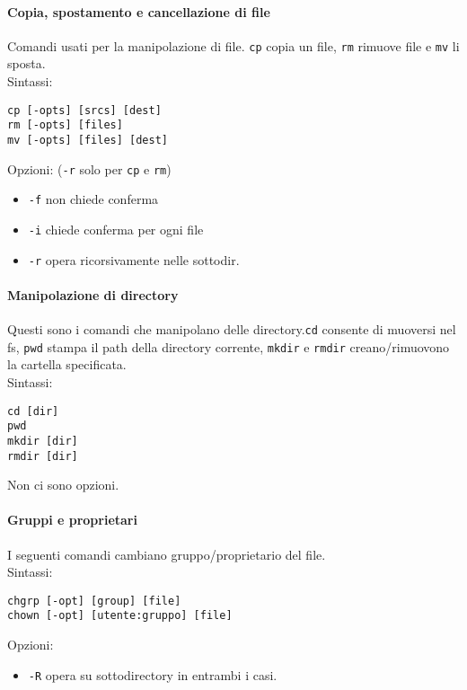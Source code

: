 \documentclass[a4paper]{article}
\begin{document}
\paragraph{Copia, spostamento e cancellazione di file} Comandi usati per la manipolazione di file. \verb|cp| copia un file, \verb|rm| rimuove file e \verb|mv| li sposta.\\
Sintassi:
\begin{verbatim}
cp [-opts] [srcs] [dest]
rm [-opts] [files]
mv [-opts] [files] [dest]
\end{verbatim}
Opzioni: (\verb|-r| solo per \verb|cp| e \verb|rm|)
\begin{itemize}
\item \verb|-f| non chiede conferma
\item \verb|-i| chiede conferma per ogni file
\item \verb|-r| opera ricorsivamente nelle sottodir.
\end{itemize}

\paragraph{Manipolazione di directory} Questi sono i comandi che manipolano delle directory.\verb|cd| consente di muoversi nel fs, \verb|pwd| stampa il path della directory corrente, \verb|mkdir| e \verb|rmdir| creano/rimuovono la cartella specificata.\\
Sintassi:
\begin{verbatim}
cd [dir]
pwd
mkdir [dir]
rmdir [dir]
\end{verbatim}
Non ci sono opzioni.

\paragraph{Gruppi e proprietari} I seguenti comandi cambiano gruppo/proprietario del file.\\
Sintassi:
\begin{verbatim}
chgrp [-opt] [group] [file]
chown [-opt] [utente:gruppo] [file]
\end{verbatim}
Opzioni:
\begin{itemize}
\item \verb|-R| opera su sottodirectory in entrambi i casi.
\end{itemize}
\end{document}
